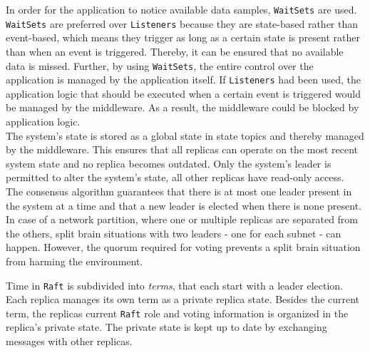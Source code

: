In order for the application to notice available data samples, \texttt{WaitSets} are used.
\texttt{WaitSets} are preferred over \texttt{Listeners} because they are state-based rather than event-based, which means they trigger as long as a certain state is present rather than when an event is triggered.
Thereby, it can be ensured that no available data is missed.
Further, by using \texttt{WaitSets}, the entire control over the application is managed by the application itself.
If \texttt{Listeners} had been used, the application logic that should be executed when a certain event is triggered would be managed by the middleware.
As a result, the middleware could be blocked by application logic.
\\

The system's state is stored as a global state in  state topics and thereby managed by the middleware.
This ensures that all replicas can operate on the most recent system state and no replica becomes outdated.
Only the system's leader is permitted to alter the system's state, all other replicas have read-only access.
\\

The consensus algorithm guarantees that there is at most one leader present in the system at a time and that a new leader is elected when there is none present.
In case of a network partition, where one or multiple replicas are separated from the others, split brain situations with two leaders - one for each subnet - can happen.
However, the quorum required for voting prevents a split brain situation from harming the environment.

Time in \texttt{Raft} is subdivided into \textit{terms}, that each start with a leader election.
Each replica manages its own term as a private replica state.
Besides the current term, the replicas current \texttt{Raft} role and voting information is organized in the replica's private state.
The private state is kept up to date by exchanging messages with other replicas.

